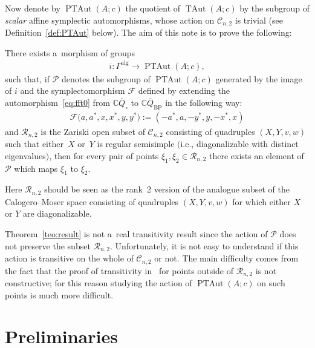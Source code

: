 \documentclass[pdftex]{sigma}
\newcommand{\p}[1]{\left(#1\right)}
\newcommand{\bb}[1]{\mathbb{#1}}
\newcommand{\app}[3]{#1\colon #2\to #3}
\newcommand{\ol}[1]{\overline{#1}}
\DeclareMathOperator{\TAut}{TAut}
\DeclareMathOperator{\PTAut}{PTAut}
\begin{document}
Now denote by \(\PTAut(A;c)\) the quotient of \(\TAut(A;c)\) by the subgroup of \emph{scalar} af\/f\/ine
symplectic automorphisms, whose action on \(\mathcal{C}_{n,2}\) is trivial (see
Def\/inition~\ref{def:PTAut} below).
The aim of this note is to prove the following:
\begin{theorem}
\label{teo:result}
There exists a~morphism of groups
\begin{gather}
\label{eq:map}
\app{i}{\Gamma^{\mathrm{alg}}}{\PTAut(A;c)},
\end{gather}
such that, if \(\mathcal{P}\) denotes the subgroup of \(\PTAut(A;c)\) generated by the image of \(i\) and
the symplectomorphism \(\mathcal{F}\) defined by extending the automorphism~\eqref{eq:fft0} from
\(\bb{C}\ol{Q}_{\circ}\) to \(\bb{C}\ol{Q}_{\mathrm{BP}}\) in the following way:
\begin{gather}
\label{eq:def-fft}
\mathcal{F}\big(a,a^{*},x,x^{*},y,y^{*}\big)\mathrel{:=}(-a^{*},a,-y^{*},y,-x^{*},x)
\end{gather}
and \(\mathcal{R}_{n,2}\) is the Zariski open subset of \(\mathcal{C}_{n,2}\) consisting of quadruples
\(\p{X,Y,v,w}\) such that either~\(X\) or~\(Y\) is regular semisimple $($i.e., diagonalizable with distinct
eigenvalues$)$, then for every pair of points \(\xi_1,\xi_2\in \mathcal{R}_{n,2}\) there exists an element of
\(\mathcal{P}\) which maps \(\xi_1\) to \(\xi_2\).
\end{theorem}

Here \(\mathcal{R}_{n,2}\) should be seen as the rank~2 version of the analogue subset of the
Calogero--Moser space consisting of quadruples \((X,Y,v,w)\) for which either \(X\) or \(Y\) are
diagonalizable.

\begin{remark}
Theorem~\ref{teo:result} is not a~real transitivity result since the action of \(\mathcal{P}\) does not
preserve the subset \(\mathcal{R}_{n,2}\).
Unfortunately, it is not easy to understand if this action is transitive on the whole of
\(\mathcal{C}_{n,2}\) or not.
The main dif\/f\/iculty comes from the fact that the proof of transitivity in~\cite{bp08} for points
outside of \(\mathcal{R}_{n,2}\) is not constructive; for this reason studying the action of
\(\PTAut(A;c)\) on such points is much more dif\/f\/icult.
\end{remark}

\section{Preliminaries}
\end{document}
